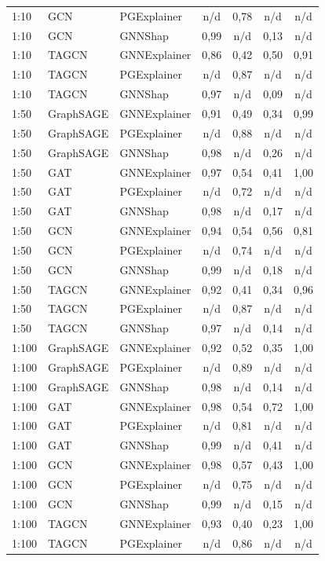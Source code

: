 \begin{longtable}{lll cccc}
1:10 & GCN & PGExplainer & n/d & 0,78 & n/d & n/d \\
1:10 & GCN & GNNShap & 0,99 & n/d & 0,13 & n/d \\
1:10 & TAGCN & GNNExplainer & 0,86 & 0,42 & 0,50 & 0,91 \\
1:10 & TAGCN & PGExplainer & n/d & 0,87 & n/d & n/d \\
1:10 & TAGCN & GNNShap & 0,97 & n/d & 0,09 & n/d \\
1:50 & GraphSAGE & GNNExplainer & 0,91 & 0,49 & 0,34 & 0,99 \\
1:50 & GraphSAGE & PGExplainer & n/d & 0,88 & n/d & n/d \\
1:50 & GraphSAGE & GNNShap & 0,98 & n/d & 0,26 & n/d \\
1:50 & GAT & GNNExplainer & 0,97 & 0,54 & 0,41 & 1,00 \\
1:50 & GAT & PGExplainer & n/d & 0,72 & n/d & n/d \\
1:50 & GAT & GNNShap & 0,98 & n/d & 0,17 & n/d \\
1:50 & GCN & GNNExplainer & 0,94 & 0,54 & 0,56 & 0,81 \\
1:50 & GCN & PGExplainer & n/d & 0,74 & n/d & n/d \\
1:50 & GCN & GNNShap & 0,99 & n/d & 0,18 & n/d \\
1:50 & TAGCN & GNNExplainer & 0,92 & 0,41 & 0,34 & 0,96 \\
1:50 & TAGCN & PGExplainer & n/d & 0,87 & n/d & n/d \\
1:50 & TAGCN & GNNShap & 0,97 & n/d & 0,14 & n/d \\
1:100 & GraphSAGE & GNNExplainer & 0,92 & 0,52 & 0,35 & 1,00 \\
1:100 & GraphSAGE & PGExplainer & n/d & 0,89 & n/d & n/d \\
1:100 & GraphSAGE & GNNShap & 0,98 & n/d & 0,14 & n/d \\
1:100 & GAT & GNNExplainer & 0,98 & 0,54 & 0,72 & 1,00 \\
1:100 & GAT & PGExplainer & n/d & 0,81 & n/d & n/d \\
1:100 & GAT & GNNShap & 0,99 & n/d & 0,41 & n/d \\
1:100 & GCN & GNNExplainer & 0,98 & 0,57 & 0,43 & 1,00 \\
1:100 & GCN & PGExplainer & n/d & 0,75 & n/d & n/d \\
1:100 & GCN & GNNShap & 0,99 & n/d & 0,15 & n/d \\
1:100 & TAGCN & GNNExplainer & 0,93 & 0,40 & 0,23 & 1,00 \\
1:100 & TAGCN & PGExplainer & n/d & 0,86 & n/d & n/d \\

\end{longtable}

